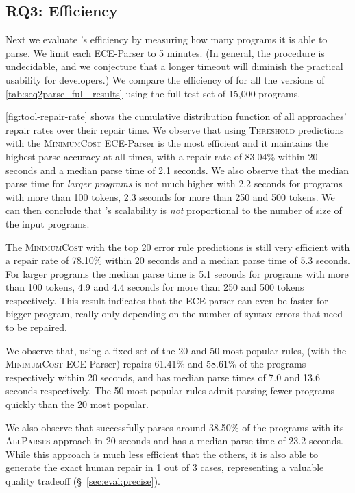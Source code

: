 \subsection{RQ3: Efficiency}
\label{sec:eval:efficiency}

Next we evaluate \toolname's efficiency by measuring how many programs it is
able to parse. We limit each ECE-Parser to 5 minutes. (In general, the procedure
is undecidable, and we conjecture that a longer timeout will diminish the
practical usability for developers.) We compare the efficiency of \toolname for
all the versions of \autoref{tab:seq2parse_full_results} using the full test set
of 15,000 programs.


\autoref{fig:tool-repair-rate} shows the cumulative distribution function of all
\toolname approaches' repair rates over their repair time. We observe that using
\textsc{Threshold} predictions with the \textsc{MinimumCost} ECE-Parser is the
most efficient and it maintains the highest parse accuracy at all times, with a
repair rate of 83.04\% within 20 seconds and a median parse time of 2.1 seconds.
We also observe that the median parse time for \emph{larger programs} is not
much higher with 2.2 seconds for programs with more than 100 tokens, 2.3 seconds
for more than 250 and 500 tokens. We can then conclude that \toolname's
scalability is \emph{not} proportional to the number of size of the input
programs.

The \textsc{MinimumCost} with the top 20 error rule predictions is still very
efficient with a repair rate of 78.10\% within 20 seconds and a median parse
time of 5.3 seconds. For larger programs the median parse time is 5.1 seconds
for programs with more than 100 tokens, 4.9 and 4.4 seconds for more than 250
and 500 tokens respectively. This result indicates that the ECE-parser can even
be faster for bigger program, really only depending on the number of syntax
errors that need to be repaired.

We observe that, using a fixed set of the 20 and 50 most popular rules,
\toolname (with the \textsc{MinimumCost} ECE-Parser) repairs 61.41\% and 58.61\%
of the programs respectively within 20 seconds, and has median parse times of
7.0 and 13.6 seconds respectively. The 50 most popular rules admit parsing fewer
programs quickly than the 20 most popular.

We also observe that \toolname successfully parses around 38.50\% of the
programs with its \textsc{AllParses} approach in 20 seconds and has a median
parse time of 23.2 seconds. While this approach is much less efficient that the
others, it is also able to generate the exact human repair in 1 out of 3
cases, representing a valuable quality tradeoff (\S~\ref{sec:eval:precise}).

